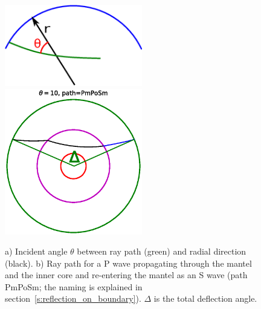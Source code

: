 \documentclass{mm2}
\begin{document}
\begin{figure}[ht]
    \centering
  \includegraphics[width=6cm]{figures/rayangle.eps}
\includegraphics[width=6cm]{figures/demo_trajectory.eps}
\caption{a) Incident angle $\theta$ between ray path (green) and radial 
direction (black).
b) Ray path for a P wave propagating through the mantel and the inner 
core and re-entering the mantel as an S wave (path PmPoSm; the naming
is explained in section~\ref{s:reflection_on_boundary}). $\Delta$ is the 
total deflection angle.}
\label{fig:rayangle}
\end{figure}
\end{document}
